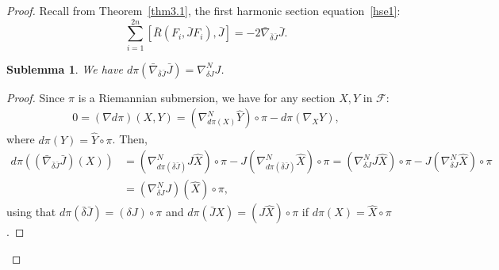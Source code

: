 \documentclass[a4paper,reqno]{amsart}
\newtheorem{sublem}[thm]{Sublemma}
\newtheorem{lemma}[thm]{Lemma}
\theoremstyle{definition}
\theoremstyle{remark}
\theoremstyle{plain}
\numberwithin{equation}{section}
\newcommand{\f}{\mathcal{F}}
\begin{document}
\begin{proof}  
Recall from Theorem~\ref{thm3.1}, the first harmonic section
equation~\eqref{hse1}:  
$$
\sum_{i=1}^{2n}[\bar{R}(F_i,\bar{J}
F_i),\bar{J}]=-2\bar{\nabla}_{\bar{\delta} \bar{J}} \bar{J} .
$$

 \begin{sublem}\label{lemma4.1} 
We have
$d\pi(\bar{\nabla}_{\bar{\delta} \bar{J}} \bar{J})=\nabla^N_{\delta J
} J$.
\end{sublem}

\begin{proof}  
  Since $\pi$ is a Riemannian submersion, we have for any section
  $X, Y$ in $\f$:
\begin{align*}
0=(\nabla d\pi)(X, Y)=(\nabla^N_{d\pi(X)}\hat{Y})\circ \pi -d\pi(\nabla_X Y),
\end{align*}
where $d\pi(Y)=\hat{Y}\circ \pi$.
Then,
\begin{align*}
d\pi\left((\bar{\nabla}_{\bar{\delta} \bar{J}} \bar{J})(X)\right)
&=(\nabla^N_{d\pi(\bar{\delta}\bar{J})}J\hat{X})\circ \pi -
  J(\nabla^N_{d\pi({\bar{\delta}\bar{J}})}\hat X)\circ \pi
  =(\nabla^N_{\delta J}J\hat{X})\circ \pi -J(\nabla^N_{\delta
  J}\hat{X})\circ \pi\\ 
&=(\nabla^N_{\delta  J} J)(\hat{X})\circ \pi,
\end{align*}
using that $d\pi(\bar{\delta}\bar{J})=(\delta  J)\circ \pi$ and
$d\pi(\bar{J}X)=( J \hat{X})\circ \pi$ if
$d\pi(X)=\hat{X} \circ \pi$.
\end{proof}


\end{proof}
\end{document}
